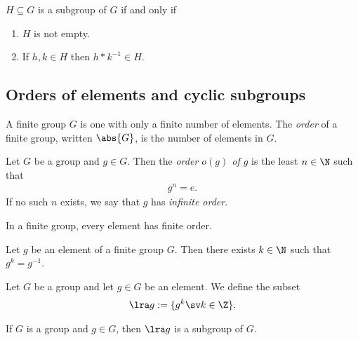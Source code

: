 \documentclass{article}
\begin{document}
\begin{theorem}
    $H\subseteq G$ is a subgroup of $G$ if and only if
    \begin{enumerate}[label=$\widetilde{\text{S\arabic*}}$.]
        \item $H$ is not empty.
        \item If $h,k\in H$ then $h*k^{-1}\in H$.
    \end{enumerate}
\end{theorem}

\subsection{Orders of elements and cyclic subgroups}

\setcounter{theorem}{2}
\begin{definition}
    A finite group $G$ is one with only a finite number of elements.
    The \emph{order} of a finite group, written $\abs{G}$, is the
    number of elements in $G$.
\end{definition}

\begin{definition}
    Let $G$ be a group and $g\in G$. Then the \emph{order $o(g)$ of $g$}
    is the least $n\in\N$ such that
    \begin{align*}
        g^n = e.
    \end{align*}
    If no such $n$ exists, we say that $g$ has \emph{infinite order}.
\end{definition}

\setcounter{theorem}{5}
\begin{theorem}
    In a finite group, every element has finite order.
\end{theorem}

\begin{corollary}
    Let $g$ be an element of a finite group $G$. Then there exists $k\in\N$
    such that $g^k=g^{-1}$.
\end{corollary}

\begin{definition}
    Let $G$ be a group and let $g\in G$ be an element. We define the
    subset
    \begin{align*}
        \lra g := \{g^k \sv k\in\Z\}.
    \end{align*}
\end{definition}

\begin{lemma}
    If $G$ is a group and $g\in G$, then $\lra g$ is a subgroup of $G$.
\end{lemma}
\end{document}

